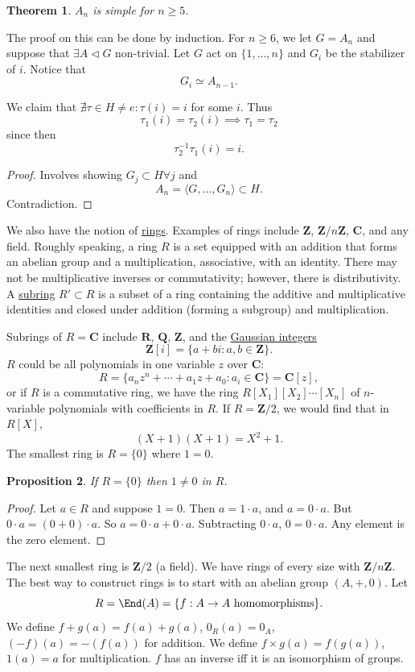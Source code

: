 \documentclass[11pt, oneside]{amsart}
\numberwithin{equation}{section}
\newtheorem{theorem}{Theorem}
\numberwithin{theorem}{section}
\newtheorem{proposition}[theorem]{Proposition}
\theoremstyle{definition}
\def\Z{\mathbf{Z}}
\def\R{\mathbf{R}}
\def\Q{\mathbf{Q}}
\def\C{\mathbf{C}}
\begin{document}
{\begin{theorem}
$A_n$ is simple for $n\geqslant 5$.
\end{theorem}
The proof on this can be done by induction. For $n \geqslant 6$, we let $G=A_n$ and suppose that $\exists A\lhd G$ non-trivial. Let $G$ act on $\{1,\hdots,n\}$ and $G_i$ be the stabilizer of $i$. Notice that
$$
G_i \simeq A_{n-1}.
$$

We claim that $\nexists \tau\in H\neq e : \tau(i) = i$ for some $i$. Thus 
$$
\tau_1(i) = \tau_2(i)\implies \tau_1=\tau_2
$$ 
since then 
$$
\tau_2^{-1}\tau_1(i) = i.
$$
\begin{proof}
Involves showing $G_j\subset H \forall j$ and 
$$
A_n = \langle G,\hdots,G_n\rangle \subset H.
$$
Contradiction.
\end{proof}


We also have the notion of \underline{rings}. Examples of rings include $\Z$, $\Z/n\Z$, $\C$, and any field. Roughly speaking, a ring $R$ is a set equipped with an addition that forms an abelian group and a multiplication, associative, with an identity. There may not be multiplicative inverses or commutativity; however, there is distributivity. A \underline{subring} $R'\subset R$ is a subset of a ring containing the additive and multiplicative identities and closed under addition (forming a subgroup) and multiplication. 

Subrings of $R =\C$ include $\R$, $\Q$, $\Z$, and the \underline{Gaussian integers}
$$
\Z[i] = \{a + bi :a,b \in \Z\}.
$$
$R$ could be all polynomials in one variable $z$ over $\C$:
$$
R = \{a_nz^n + \cdots + a_1z + a_0 : a_i\in \C\} = \C[z],
$$
or if $R$ is a commutative ring, we have the ring $R[X_1][X_2]\cdots[X_n]$ of $n$-variable polynomials with coefficients in $R$. If $R =\Z/2$, we would find that in $R[X]$,
$$
(X+1)(X+1) = X^2 + 1.
$$
The smallest ring is $R=\{0\}$ where $1=0$.
\begin{proposition}
If $R=\{0\}$ then $1\neq 0$ in $R$.
\end{proposition}
\begin{proof}
Let $a\in R$ and suppose $1=0$. Then $a = 1\cdot a$, and $a = 0\cdot a$. But $0\cdot a = (0+0)\cdot a$. So $a = 0\cdot a + 0\cdot a$. Subtracting $0\cdot a$, $0 = 0\cdot a$. Any element is the zero element. 
\end{proof}
The next smallest ring is $\Z/2$ (a field). We have rings of every size with $\Z/n\Z$. The best way to construct rings is to start with an abelian group $(A,+,0)$. Let 
$$
R = \End(A) = \{f : A\to A \textrm{ homomorphisms}\}.
$$
We define $f+g(a) = f(a) + g(a)$, $0_R(a) = 0_A$, $(-f)(a) = -(f(a))$ for addition. We define $f\times g(a) = f(g(a))$, $1(a) = a$ for multiplication. $f$ has an inverse iff it is an isomorphism of groups. 

}
\end{document}
